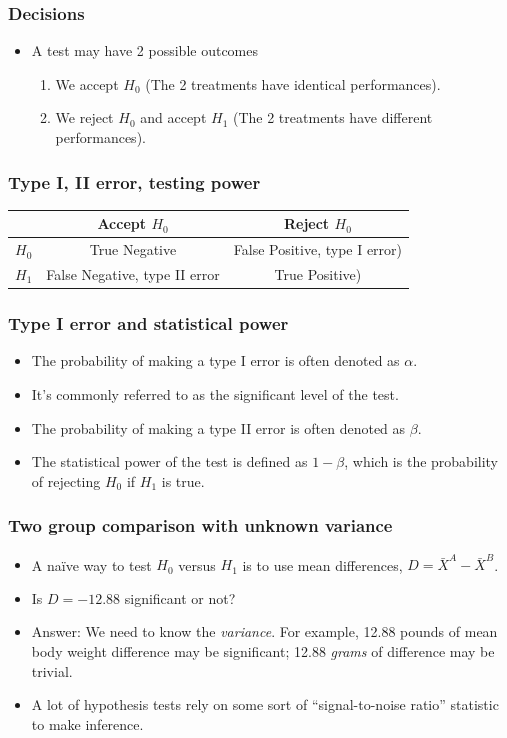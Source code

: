 \begin{frame}
  \frametitle{Decisions}
  \begin{itemize}
  \item A test may have 2 possible outcomes
    \begin{enumerate}
    \item We accept $H_{0}$ (The 2 treatments have identical
      performances).
    \item We reject $H_{0}$ and accept $H_{1}$ (The 2 treatments have
      different performances).
    \end{enumerate}
  \end{itemize}
\end{frame}

\begin{frame}
  \frametitle{Type I, II error, testing power}
  \begin{tabular}{|l|c|c|}
    & Accept $H_0$ & Reject $H_0$ \\
    \hline
    $H_0$  & True Negative & False Positive, type I error) \\
    \hline
    $H_1$  & False Negative, type II error & True Positive) \\
  \end{tabular}
\end{frame}

\begin{frame}
  \frametitle{Type I error and statistical power}
  \begin{itemize}
  \item The probability of making a type I error is often denoted as
    $\alpha$.
  \item It's commonly referred to as the \alert{significant level} of the test.
  \item The probability of making a type II error is often denoted as
    $\beta$.
  \item The \alert{statistical power} of the test is defined as
    $1-\beta$, which is the probability of rejecting $H_{0}$ if
    $H_{1}$ is true.
  \end{itemize}
\end{frame}

\begin{frame}
  \frametitle{Two group comparison with unknown variance}
  \begin{itemize}
  \item A na\"ive way to test $H_{0}$ versus $H_{1}$ is to use mean
    differences, $D = \bar{X}^{A} - \bar{X}^{B}$.
  \item Is $D = -12.88$ significant or not?
  \item Answer: We need to know the \emph{variance}.  For example,
    12.88 pounds of mean body weight difference may be significant;
    12.88 \emph{grams} of difference may be trivial.
  \item A lot of hypothesis tests rely on some sort of
    ``signal-to-noise ratio'' statistic to make inference.
  \end{itemize}
\end{frame}

